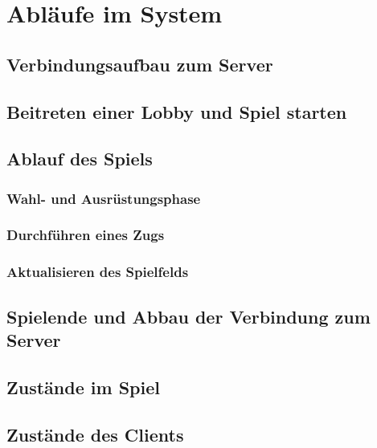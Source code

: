 \documentclass{uulm-assignment}
\begin{document}
\clearpage
\section{Abläufe im System}
\subsection{Verbindungsaufbau zum Server}


\subsection{Beitreten einer Lobby und Spiel starten}
\label{Sequ_Lobby}


\clearpage
\subsection{Ablauf des Spiels}
\subsubsection{Wahl- und Ausrüstungsphase}


\subsubsection{Durchführen eines Zugs}


\subsubsection{Aktualisieren des Spielfelds}


\subsection{Spielende und Abbau der Verbindung zum Server}
\label{Sequ_Winner}

\clearpage

\subsection{Zustände im Spiel}

\clearpage

\clearpage
\subsection{Zustände des Clients}

\end{document}

